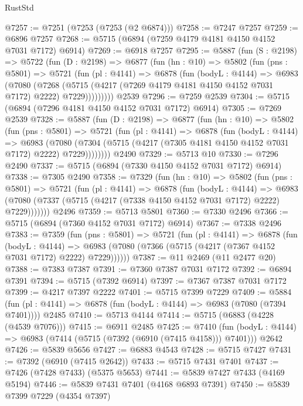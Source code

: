 \begin{lexlean}{RustStd}
\begin{coremodule}
@7257 := @7251 (@7253 (@7253 (@2 @6874)))
@7258 := @7247 @7257
@7259 := @6896 @7257
@7268 := @5715 (@6894 (@7259 @4179 @4181 @4150 @4152 @7031 @7172) @6914)
@7269 := @6918 @7257
@7295 := @5887
    (fun (S : @2198) =>
    @5722
      (fun (D : @2198) =>
      @6877
        (fun (hn : @10) =>
        @5802
          (fun (pns : @5801) =>
          @5721
            (fun (pl : @4141) =>
            @6878
              (fun (bodyL : @4144) =>
              @6983
                (@7080
                  (@7268
                    (@5715 (@4217 (@7269 @4179 @4181 @4150 @4152 @7031 @7172) @2222) @7229)))))))))
    @2539
@7296 := @7259 @2539
@7304 := @5715 (@6894 (@7296 @4181 @4150 @4152 @7031 @7172) @6914)
@7305 := @7269 @2539
@7328 := @5887
    (fun (D : @2198) =>
    @6877
      (fun (hn : @10) =>
      @5802
        (fun (pns : @5801) =>
        @5721
          (fun (pl : @4141) =>
          @6878
            (fun (bodyL : @4144) =>
            @6983
              (@7080 (@7304 (@5715 (@4217 (@7305 @4181 @4150 @4152 @7031 @7172) @2222) @7229))))))))
    @2490
@7329 := @5713 @10
@7330 := @7296 @2490
@7337 := @5715 (@6894 (@7330 @4150 @4152 @7031 @7172) @6914)
@7338 := @7305 @2490
@7358 := @7329
    (fun (hn : @10) =>
    @5802
      (fun (pns : @5801) =>
      @5721
        (fun (pl : @4141) =>
        @6878
          (fun (bodyL : @4144) =>
          @6983 (@7080 (@7337 (@5715 (@4217 (@7338 @4150 @4152 @7031 @7172) @2222) @7229)))))))
    @2496
@7359 := @5713 @5801
@7360 := @7330 @2496
@7366 := @5715 (@6894 (@7360 @4152 @7031 @7172) @6914)
@7367 := @7338 @2496
@7383 := @7359
    (fun (pns : @5801) =>
    @5721
      (fun (pl : @4141) =>
      @6878
        (fun (bodyL : @4144) =>
        @6983 (@7080 (@7366 (@5715 (@4217 (@7367 @4152 @7031 @7172) @2222) @7229))))))
@7387 := @11 @2469 (@11 @2477 @20)
@7388 := @7383 @7387
@7391 := @7360 @7387 @7031 @7172
@7392 := @6894 @7391
@7394 := @5715 (@7392 @6914)
@7397 := @7367 @7387 @7031 @7172
@7399 := @4217 @7397 @2222
@7401 := @5715 @7399 @7229
@7409 := @5884
    (fun (pl : @4141) => @6878 (fun (bodyL : @4144) => @6983 (@7080 (@7394 @7401))))
    @2485
@7410 := @5713 @4144
@7414 := @5715 (@6883 (@4228 (@4539 @7076)))
@7415 := @6911 @2485
@7425 := @7410
    (fun (bodyL : @4144) => @6983 (@7414 (@5715 (@7392 (@6910 (@7415 @4158))) @7401)))
    @2642
@7426 := @5839 @5656
@7427 := @6883 @4543
@7428 := @5715 @7427
@7431 := @7392 (@6910 (@7415 @2642))
@7433 := @5715 @7431 @7401
@7437 := @7426 (@7428 @7433) (@5375 @5653)
@7441 := @5839 @7427 @7433 (@4169 @5194)
@7446 := @5839 @7431 @7401 (@4168 @6893 @7391)
@7450 := @5839 @7399 @7229 (@4354 @7397)

\end{coremodule}
\end{lexlean}
